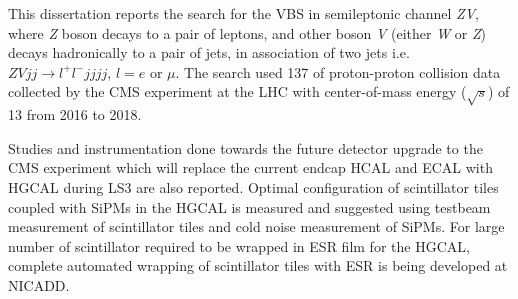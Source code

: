 This dissertation reports the search for
the \gls{VBS} in semileptonic channel \textit{ZV},
where \textit{Z} boson decays to a pair of leptons,
and other boson \textit{V} (either \textit{W} or \textit{Z})
decays hadronically to a pair of jets, in association of two jets
i.e.~\( \textit{ZV}jj \rightarrow l^{+}l^-jjjj \), \( l=e \) or \( \mu \).
The search used 137 \fbinv{} of proton-proton collision data collected by
the \gls{CMS} experiment at the \gls{LHC} with
center-of-mass energy (\( \sqrt{s} \)) of 13 \TeV{} from 2016 to 2018.


Studies and instrumentation done towards the future detector
upgrade to the \gls{CMS} experiment which will replace
the current endcap \gls{HCAL} and \gls{ECAL} with \gls{HGCAL}
during \gls{LS3} are also reported.
Optimal configuration
of scintillator tiles coupled with \glspl{SiPM}
in the \gls{HGCAL} is measured and suggested using testbeam measurement of
scintillator tiles and cold noise measurement of \glspl{SiPM}.
For large number of scintillator required to
be wrapped in \gls{ESR} film for the \gls{HGCAL},
complete automated wrapping of scintillator tiles with
\gls{ESR} is being developed at \gls{NICADD}.
